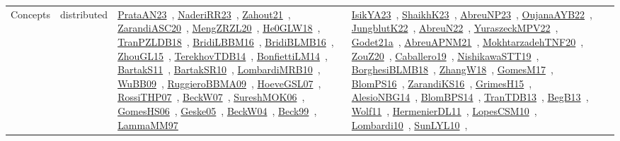 {\begin{longtable}{lp{3cm}>{\raggedright\arraybackslash}p{6cm}>{\raggedright\arraybackslash}p{6cm}>{\raggedright\arraybackslash}p{8cm}}
Concepts & distributed & \href{works/PrataAN23.pdf}{PrataAN23}~\cite{PrataAN23}, \href{works/NaderiRR23.pdf}{NaderiRR23}~\cite{NaderiRR23}, \href{works/Zahout21.pdf}{Zahout21}~\cite{Zahout21}, \href{works/ZarandiASC20.pdf}{ZarandiASC20}~\cite{ZarandiASC20}, \href{works/MengZRZL20.pdf}{MengZRZL20}~\cite{MengZRZL20}, \href{works/He0GLW18.pdf}{He0GLW18}~\cite{He0GLW18}, \href{works/TranPZLDB18.pdf}{TranPZLDB18}~\cite{TranPZLDB18}, \href{works/BridiLBBM16.pdf}{BridiLBBM16}~\cite{BridiLBBM16}, \href{works/BridiBLMB16.pdf}{BridiBLMB16}~\cite{BridiBLMB16}, \href{works/ZhouGL15.pdf}{ZhouGL15}~\cite{ZhouGL15}, \href{works/TerekhovTDB14.pdf}{TerekhovTDB14}~\cite{TerekhovTDB14}, \href{works/BonfiettiLM14.pdf}{BonfiettiLM14}~\cite{BonfiettiLM14}, \href{works/BartakS11.pdf}{BartakS11}~\cite{BartakS11}, \href{works/BartakSR10.pdf}{BartakSR10}~\cite{BartakSR10}, \href{works/LombardiMRB10.pdf}{LombardiMRB10}~\cite{LombardiMRB10}, \href{works/WuBB09.pdf}{WuBB09}~\cite{WuBB09}, \href{works/RuggieroBBMA09.pdf}{RuggieroBBMA09}~\cite{RuggieroBBMA09}, \href{works/HoeveGSL07.pdf}{HoeveGSL07}~\cite{HoeveGSL07}, \href{works/RossiTHP07.pdf}{RossiTHP07}~\cite{RossiTHP07}, \href{works/BeckW07.pdf}{BeckW07}~\cite{BeckW07}, \href{works/SureshMOK06.pdf}{SureshMOK06}~\cite{SureshMOK06}, \href{works/GomesHS06.pdf}{GomesHS06}~\cite{GomesHS06}, \href{works/Geske05.pdf}{Geske05}~\cite{Geske05}, \href{works/BeckW04.pdf}{BeckW04}~\cite{BeckW04}, \href{works/Beck99.pdf}{Beck99}~\cite{Beck99}, \href{works/LammaMM97.pdf}{LammaMM97}~\cite{LammaMM97} & \href{works/IsikYA23.pdf}{IsikYA23}~\cite{IsikYA23}, \href{works/ShaikhK23.pdf}{ShaikhK23}~\cite{ShaikhK23}, \href{works/AbreuNP23.pdf}{AbreuNP23}~\cite{AbreuNP23}, \href{works/OujanaAYB22.pdf}{OujanaAYB22}~\cite{OujanaAYB22}, \href{works/JungblutK22.pdf}{JungblutK22}~\cite{JungblutK22}, \href{works/AbreuN22.pdf}{AbreuN22}~\cite{AbreuN22}, \href{works/YuraszeckMPV22.pdf}{YuraszeckMPV22}~\cite{YuraszeckMPV22}, \href{works/Godet21a.pdf}{Godet21a}~\cite{Godet21a}, \href{works/AbreuAPNM21.pdf}{AbreuAPNM21}~\cite{AbreuAPNM21}, \href{works/MokhtarzadehTNF20.pdf}{MokhtarzadehTNF20}~\cite{MokhtarzadehTNF20}, \href{works/ZouZ20.pdf}{ZouZ20}~\cite{ZouZ20}, \href{works/Caballero19.pdf}{Caballero19}~\cite{Caballero19}, \href{works/NishikawaSTT19.pdf}{NishikawaSTT19}~\cite{NishikawaSTT19}, \href{works/BorghesiBLMB18.pdf}{BorghesiBLMB18}~\cite{BorghesiBLMB18}, \href{works/ZhangW18.pdf}{ZhangW18}~\cite{ZhangW18}, \href{works/GomesM17.pdf}{GomesM17}~\cite{GomesM17}, \href{works/BlomPS16.pdf}{BlomPS16}~\cite{BlomPS16}, \href{works/ZarandiKS16.pdf}{ZarandiKS16}~\cite{ZarandiKS16}, \href{works/GrimesH15.pdf}{GrimesH15}~\cite{GrimesH15}, \href{works/AlesioNBG14.pdf}{AlesioNBG14}~\cite{AlesioNBG14}, \href{works/BlomBPS14.pdf}{BlomBPS14}~\cite{BlomBPS14}, \href{works/TranTDB13.pdf}{TranTDB13}~\cite{TranTDB13}, \href{works/BegB13.pdf}{BegB13}~\cite{BegB13}, \href{works/Wolf11.pdf}{Wolf11}~\cite{Wolf11}, \href{works/HermenierDL11.pdf}{HermenierDL11}~\cite{HermenierDL11}, \href{works/LopesCSM10.pdf}{LopesCSM10}~\cite{LopesCSM10}, \href{works/Lombardi10.pdf}{Lombardi10}~\cite{Lombardi10}, \href{works/SunLYL10.pdf}{SunLYL10}~\cite{SunLYL10}, 
\end{longtable}}
